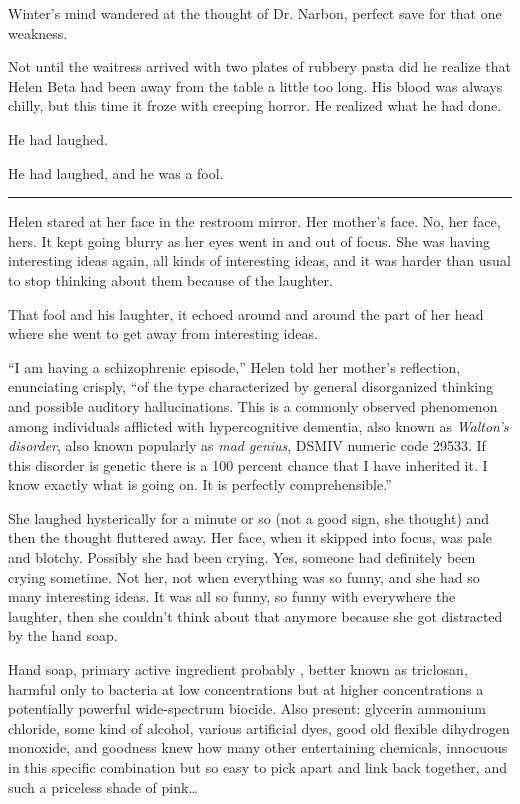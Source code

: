 \documentclass[ebook,10pt]{memoir}
\begin{document}
Winter's mind wandered at the thought of Dr. Narbon, perfect save for
that one weakness.

Not until the waitress arrived with two plates of rubbery pasta did he
realize that Helen Beta had been away from the table a little too
long. His blood was always chilly, but this time it froze with
creeping horror. He realized what he had done.

He had laughed. 

He had laughed, and he was a fool.

\pfbreak

Helen stared at her face in the restroom mirror. Her mother's
face. No, her face, hers. It kept going blurry as her eyes went in and
out of focus. She was having interesting ideas again, all kinds of
interesting ideas, and it was harder than usual to stop thinking about
them because of the laughter.

That fool and his laughter, it echoed around and around the part of her
head where she went to get away from interesting ideas.

``I am having a schizophrenic episode,'' Helen told her mother's
reflection, enunciating crisply, ``of the type characterized by
general disorganized thinking and possible auditory
hallucinations. This is a commonly observed phenomenon among
individuals afflicted with hypercognitive dementia, also known as
\emph{Walton's disorder}, also known popularly as \emph{mad genius}, 
DSMIV numeric code 29533. If this disorder is genetic there is a 100
percent chance that I have inherited it. I know exactly what is going
on. It is perfectly comprehensible.''

She laughed hysterically for a minute or so (not a good sign, she
thought) and then the thought fluttered away. Her face, when it
skipped into focus, was pale and blotchy. Possibly she had been
crying. Yes, someone had definitely been crying sometime. Not her, not
when everything was so funny, and she had so many interesting
ideas. It was all so funny, so funny with everywhere the laughter,
then she couldn't think about that anymore because she got distracted
by the hand soap.

Hand soap, primary active ingredient probably , better
known as triclosan, harmful only to bacteria at low concentrations but
at higher concentrations a potentially powerful wide-spectrum
biocide. Also present: glycerin ammonium chloride, some kind of
alcohol, various artificial dyes, good old flexible dihydrogen
monoxide, and goodness knew how many other entertaining chemicals,
innocuous in this specific combination but so easy to pick apart and
link back together, and such a priceless shade of pink\ldots
\end{document}
